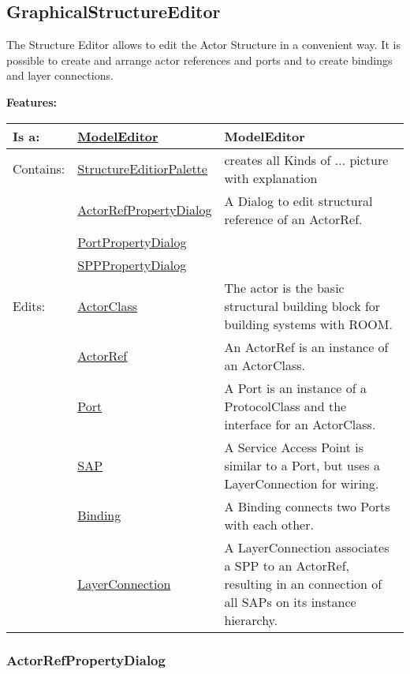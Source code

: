 	\subsection{GraphicalStructureEditor}
	The Structure Editor allows to edit the Actor Structure in a convenient way. It is possible to create and arrange actor references and ports and to create bindings and layer connections.
	
	
	\begingroup
	\textbf{Features:}
	\renewcommand{\arraystretch}{1.8} %
	\begin{longtable}{l|l p{}}
		\hline
	Is a: & \tabitem \hyperlink{ref:ModelEditor}{ModelEditor}  & ModelEditor\\
	\hline
	Contains: & \tabitem \hyperlink{ref:StructureEditiorPalette}{StructureEditiorPalette}  & creates all Kinds of ...  picture with explanation\\
	& \tabitem \hyperlink{ref:ActorRefPropertyDialog}{ActorRefPropertyDialog}  & A Dialog to edit structural reference of an ActorRef.
	 \\
	& \tabitem \hyperlink{ref:PortPropertyDialog}{PortPropertyDialog}  &  \\
	& \tabitem \hyperlink{ref:SPPPropertyDialog}{SPPPropertyDialog}  &  \\
	\hline
	Edits: & \tabitem \hyperlink{ref:ActorClass}{ActorClass}  & The actor is the basic structural building block for building systems with ROOM.\\
	& \tabitem \hyperlink{ref:ActorRef}{ActorRef}  & An ActorRef is an instance of an ActorClass. \\
	& \tabitem \hyperlink{ref:Port}{Port}  & A Port is an instance of a ProtocolClass and the interface for an ActorClass. \\
	& \tabitem \hyperlink{ref:SAP}{SAP}  & A Service Access Point is similar to a Port, but uses a LayerConnection for wiring. \\
	& \tabitem \hyperlink{ref:Binding}{Binding}  & A Binding connects two Ports with each other. \\
	& \tabitem \hyperlink{ref:LayerConnection}{LayerConnection}  & A LayerConnection associates a SPP to an ActorRef, resulting in an connection of all SAPs on its instance hierarchy. \\
	\hline
	\end{longtable}
	\endgroup
	
	
	\subsubsection{ActorRefPropertyDialog}
		\hypertarget{ref:ActorRefPropertyDialog}{}
		
